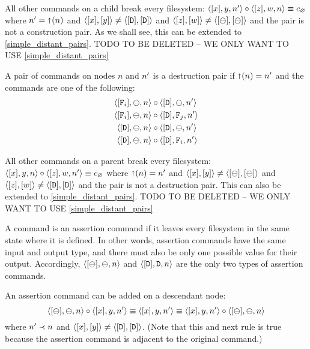 \begin{myax}
All other commands on a child break every filesystem:
$\cxynnv\cc\czwnv \equiv \cbrk$ where $\nn=\parent(n)$ and $\cxy\neq\cdd$ and $\czw\neq\cbb$
and the pair is not a construction pair.
As we shall see, this can be extended to \cref{simple_distant_pairs}.
TODO TO BE DELETED -- WE ONLY WANT TO USE \cref{simple_distant_pairs}
\end{myax}

\begin{mydef}
A pair of commands on nodes $n$ and $\nn$ is a destruction pair if $\parent(n)=\nn$ and the commands are one
of the following:
   \begin{align*}
            \cfba{n}&\cc  \cdba{\nn} \\
            \cfba{n}&\cc  \caaa{\vald}{\valff}{\nn} \\
            \cdba{n}&\cc  \cdba{\nn} \\
            \cdba{n}&\cc  \cdfaa{\nn}
   \end{align*}
\end{mydef}

\begin{myax}
All other commands on a parent break every filesystem:
$\cxynv\cc\czwnnv \equiv \cbrk$ where $\parent(n)=\nn$ and $\cxy\neq\cbb$ and $\czw\neq\cdd$
and the pair is not a destruction pair.
This can also be extended to \cref{simple_distant_pairs}.
TODO TO BE DELETED -- WE ONLY WANT TO USE \cref{simple_distant_pairs}
\end{myax}

\begin{mydef}
A command is an assertion command if
it leaves every filesystem in the same state
where it is defined.
In other words, assertion commands have the same input and output type,
and there must also be only one possible value for their output.
Accordingly, $\cbba{n}$ and $\cdda{n}$ are the only two types of assertion commands.
\end{mydef}

\begin{myax}
An assertion command can be added on a descendant node:
\[ \cbba{n}\cc\cxynnv \equiv \cxynnv \equiv \cxynnv\cc\cbba{n} \] 
where $\nn\descendant n$ and $\cxy\neq\cdd$.
(Note that this and next rule is true because the assertion command is
adjacent to the original command.)
\end{myax}

